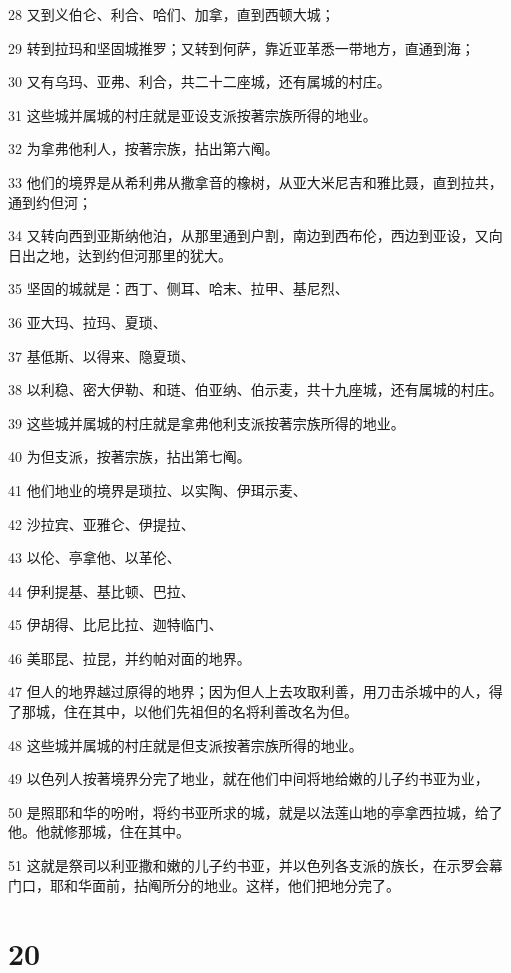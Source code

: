 \par 28 又到义伯仑、利合、哈们、加拿，直到西顿大城；
\par 29 转到拉玛和坚固城推罗；又转到何萨，靠近亚革悉一带地方，直通到海；
\par 30 又有乌玛、亚弗、利合，共二十二座城，还有属城的村庄。
\par 31 这些城并属城的村庄就是亚设支派按著宗族所得的地业。
\par 32 为拿弗他利人，按著宗族，拈出第六阄。
\par 33 他们的境界是从希利弗从撒拿音的橡树，从亚大米尼吉和雅比聂，直到拉共，通到约但河；
\par 34 又转向西到亚斯纳他泊，从那里通到户割，南边到西布伦，西边到亚设，又向日出之地，达到约但河那里的犹大。
\par 35 坚固的城就是：西丁、侧耳、哈末、拉甲、基尼烈、
\par 36 亚大玛、拉玛、夏琐、
\par 37 基低斯、以得来、隐夏琐、
\par 38 以利稳、密大伊勒、和琏、伯亚纳、伯示麦，共十九座城，还有属城的村庄。
\par 39 这些城并属城的村庄就是拿弗他利支派按著宗族所得的地业。
\par 40 为但支派，按著宗族，拈出第七阄。
\par 41 他们地业的境界是琐拉、以实陶、伊珥示麦、
\par 42 沙拉宾、亚雅仑、伊提拉、
\par 43 以伦、亭拿他、以革伦、
\par 44 伊利提基、基比顿、巴拉、
\par 45 伊胡得、比尼比拉、迦特临门、
\par 46 美耶昆、拉昆，并约帕对面的地界。
\par 47 但人的地界越过原得的地界；因为但人上去攻取利善，用刀击杀城中的人，得了那城，住在其中，以他们先祖但的名将利善改名为但。
\par 48 这些城并属城的村庄就是但支派按著宗族所得的地业。
\par 49 以色列人按著境界分完了地业，就在他们中间将地给嫩的儿子约书亚为业，
\par 50 是照耶和华的吩咐，将约书亚所求的城，就是以法莲山地的亭拿西拉城，给了他。他就修那城，住在其中。
\par 51 这就是祭司以利亚撒和嫩的儿子约书亚，并以色列各支派的族长，在示罗会幕门口，耶和华面前，拈阄所分的地业。这样，他们把地分完了。

\chapter{20}

